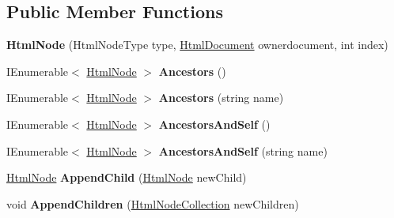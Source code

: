 \subsection*{Public Member Functions}
\begin{DoxyCompactItemize}
\item 
\mbox{\label{class_html_agility_pack_1_1_html_node_a45c77e9a164bfe301f5aa587baa790e0}} 
{\bfseries Html\+Node} (Html\+Node\+Type type, \hyperlink{class_html_agility_pack_1_1_html_document}{Html\+Document} ownerdocument, int index)
\item 
\mbox{\label{class_html_agility_pack_1_1_html_node_ac7d604337aaefbb6dc9727c34a75fb40}} 
I\+Enumerable$<$ \hyperlink{class_html_agility_pack_1_1_html_node}{Html\+Node} $>$ {\bfseries Ancestors} ()
\item 
\mbox{\label{class_html_agility_pack_1_1_html_node_a00e1743acf98dffbdc7c0231f1e80028}} 
I\+Enumerable$<$ \hyperlink{class_html_agility_pack_1_1_html_node}{Html\+Node} $>$ {\bfseries Ancestors} (string name)
\item 
\mbox{\label{class_html_agility_pack_1_1_html_node_aa344c3c6ea4ef0a752f4129ba22c23fc}} 
I\+Enumerable$<$ \hyperlink{class_html_agility_pack_1_1_html_node}{Html\+Node} $>$ {\bfseries Ancestors\+And\+Self} ()
\item 
\mbox{\label{class_html_agility_pack_1_1_html_node_a674b0a3eb47a448295668c859495c297}} 
I\+Enumerable$<$ \hyperlink{class_html_agility_pack_1_1_html_node}{Html\+Node} $>$ {\bfseries Ancestors\+And\+Self} (string name)
\item 
\mbox{\label{class_html_agility_pack_1_1_html_node_af917eeb066983ef0519461c056efcef2}} 
\hyperlink{class_html_agility_pack_1_1_html_node}{Html\+Node} {\bfseries Append\+Child} (\hyperlink{class_html_agility_pack_1_1_html_node}{Html\+Node} new\+Child)
\item 
\mbox{\label{class_html_agility_pack_1_1_html_node_a4e519d2b6aa2103cf215c7f87c26afec}} 
void {\bfseries Append\+Children} (\hyperlink{class_html_agility_pack_1_1_html_node_collection}{Html\+Node\+Collection} new\+Children)

\end{DoxyCompactItemize}
